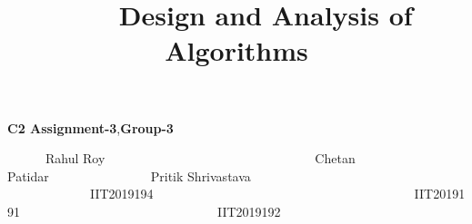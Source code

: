 \documentclass[10pt]{report}
\title{\ \ \ \  Design and Analysis of Algorithms}
\date{}
\begin{document}
\maketitle

{\fontsize{15pt}{18.0pt}\selectfont \textbf{C2 Assignment-3},\textbf{Group-3}}

\vspace{\baselineskip}
\ \ \ \ \ \  \tab  Rahul Roy\ \ \ \ \ \ \ \ \ \ \ \ \ \ \ \ \ \ \  \tab \ \ \ \ \ \ \ \ \  \tab \ \ \ \ \  Chetan Patidar\ \ \ \ \ \ \ \ \ \ \  \tab \ \ \ \ \  Pritik Shrivastava 
\ \ \ \ \ \ \ \ \ \ \ \ \  IIT2019194\ \ \ \ \ \ \ \ \ \ \ \ \ \ \ \ \ \ \ \ \ \ \ \ \ \ \ \ \ \ \ \ \ \ \ \ \ \ \ \ \ IIT2019191\ \ \ \ \ \ \ \ \ \ \ \ \ \ \ \ \ \ \ \ \ \ \ \ \ \ \ \ \ \ \   IIT2019192

\vspace{\baselineskip}
\end{document}

